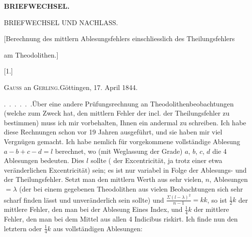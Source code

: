 \par\clearpage
\noindent{}\hfill{\small\textbf{BRIEFWECHSEL.}}\hfill\null\par
\vspace*{3.2cm}
\begin{center}
{\LARGE BRIEFWECHSEL UND NACHLASS.}\par
\vspace{1.5cm}
{\large [Berechnung des mittlern Ablesungsfehlers einschliesslich des Theilungsfehlers\par am Theodolithen.]}\par
\bigskip\bigskip
{\large [1.]}\par\medskip
{\large\textsc{Gauss} an \textsc{Gerling}.\quad Göttingen, 17. April 1844.}
\end{center}
\par\noindent\hspace*{\parindent}.\ .\ .\ .\ .\ .\enspace Über eine andere Prüfungsrechnung an Theodolithenbeobachtungen (welche zum Zweck hat, den mittlern Fehler der  incl. der Theilungsfehler zu bestimmen) muss ich mir vorbehalten, Ihnen ein andermal zu schreiben. Ich habe diese Rechnungen schon vor 19 Jahren ausgeführt, und sie haben mir viel Vergnügen gemacht. Ich habe nemlich für  vorgekommene vollständige Ablesung $a-b+c-d=l$ berechnet, wo (mit Weglassung der Grade) $a$, $b$, $c$, $d$ die 4 Ablesungen bedeuten. Dies $l$ sollte ( der Excentricität, ja trotz einer etwa veränderlichen Excentricität)  sein; es ist nur variabel in Folge der Ablesungs- und der Theilungsfehler. Setzt man den mittlern Werth aus sehr vielen, $n$, Ablesungen $=\lambda$ (der bei einem gegebenen Theodolithen aus vielen Beobachtungen sich sehr scharf finden lässt und unveränderlich sein sollte) und $\frac{\Sigma(l-\lambda)^2}{n-1}=kk$, so ist $\frac12k$ der mittlere Fehler, den man bei der Ablesung Eines Index, und $\frac14k$ der mittlere Fehler, den man bei dem Mittel aus allen 4 Indicibus riskirt. Ich finde nun den letztern oder $\frac14k$ aus vollständigen Ablesungen:

